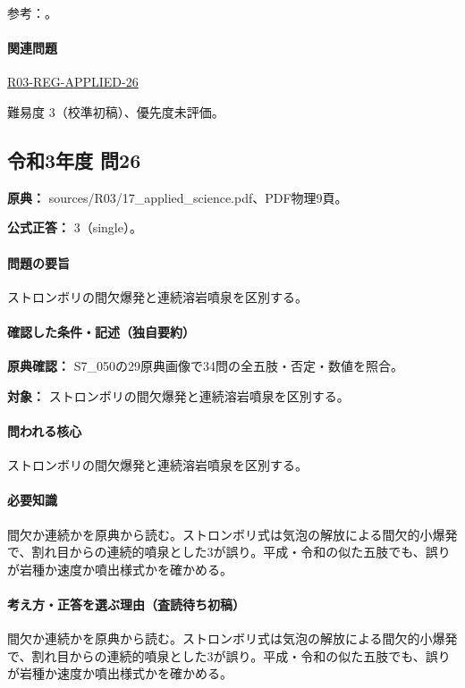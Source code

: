 \par 参考：\cite{jma_magma1999,volc_usgs_msh_flow}。

\paragraph{関連問題} \hyperref[q:r03-reg-applied-26]{R03-REG-APPLIED-26}

\par 難易度 3（校準初稿）、優先度未評価。

\subsection{令和3年度 問26}
\label{q:r03-reg-applied-26}

\noindent\textbf{原典：} sources/R03/17\_applied\_science.pdf、PDF物理9頁。

\textbf{公式正答：} 3（single）。

\paragraph{問題の要旨} ストロンボリの間欠爆発と連続溶岩噴泉を区別する。

\paragraph{確認した条件・記述（独自要約）}\mbox{}\par

\noindent\textbf{原典確認：} S7\_050の29原典画像で34問の全五肢・否定・数値を照合。\par

\noindent\textbf{対象：} ストロンボリの間欠爆発と連続溶岩噴泉を区別する。\par

\paragraph{問われる核心} ストロンボリの間欠爆発と連続溶岩噴泉を区別する。

\paragraph{必要知識} 間欠か連続かを原典から読む。ストロンボリ式は気泡の解放による間欠的小爆発で、割れ目からの連続的噴泉とした3が誤り。平成・令和の似た五肢でも、誤りが岩種か速度か噴出様式かを確かめる。

\paragraph{考え方・正答を選ぶ理由（査読待ち初稿）} 間欠か連続かを原典から読む。ストロンボリ式は気泡の解放による間欠的小爆発で、割れ目からの連続的噴泉とした3が誤り。平成・令和の似た五肢でも、誤りが岩種か速度か噴出様式かを確かめる。

